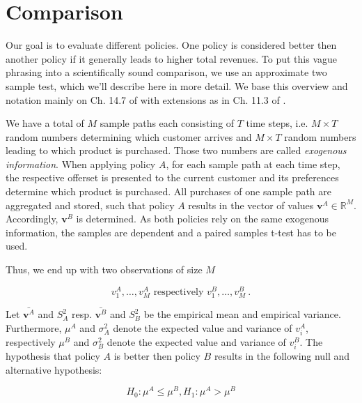 \chapter{Comparison}

Our goal is to evaluate different policies. One policy is considered better then another policy if it generally leads to higher total revenues. To put this vague phrasing into a scientifically sound comparison, we use an approximate two sample test, which we'll describe here in more detail. We base this overview and notation mainly on Ch. 14.7 of \cite{Bamberg.2011} with extensions as in Ch. 11.3 of \cite{Fahrmeir.2007}.

We have a total of $M$ sample paths each consisting of $T$ time steps, i.e. $M \times T$ random numbers determining which customer arrives and $M \times T$ random numbers leading to which product is purchased. Those two numbers are called \textit{exogenous information}. When applying policy $A$, for each sample path at each time step, the respective offerset is presented to the current customer and its preferences determine which product is purchased. All purchases of one sample path are aggregated and stored, such that policy $A$ results in the vector of values $\mathbf{v}^A \in \mathbb{R}^M$. Accordingly, $\mathbf{v}^B$ is determined. As both policies rely on the same exogenous information, the samples are dependent and a paired samples t-test has to be used.

Thus, we end up with two observations of size $M$ 

$$v^A_1, \dots, v^A_M \text{ respectively } v^B_1, \dots, v^B_M~.$$

Let $\bar{\mathbf{v}^A}$ and $S_A^2$ resp. $\bar{\mathbf{v}^B}$ and $S_B^2$ be the empirical mean and empirical variance. Furthermore, $\mu^A$ and $\sigma_A^2$ denote the expected value and variance of $v^A_i$, respectively $\mu^B$ and $\sigma_B^2$ denote the expected value and variance of $v^B_i$. The hypothesis that policy $A$ is better then policy $B$ results in the following null and alternative hypothesis:

$$H_0: \mu^A \leq \mu^B, H_1: \mu^A > \mu^B$$

